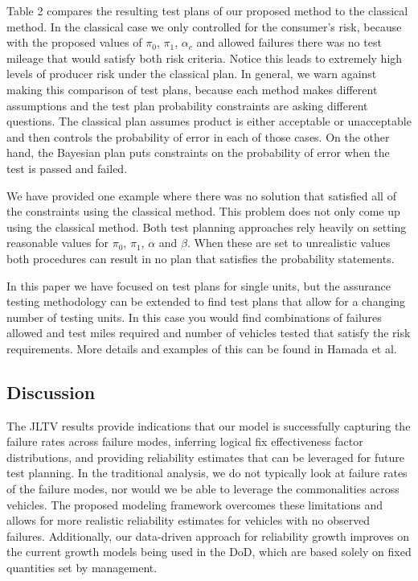 \documentclass[12pt]{article}
\begin{document}
Table 2 compares the resulting test plans of our proposed method to the classical method.  In the classical case we only controlled for the consumer's risk, because with the proposed values of  $\pi_0$, $\pi_1$, $\alpha_c$ and allowed failures there was no test mileage that would satisfy both risk criteria.  Notice this leads to extremely high levels of producer risk under the classical plan.  In general, we warn against making this comparison of test plans, because each method makes different assumptions and the test plan probability constraints are asking different questions.  The classical plan assumes product is either acceptable or unacceptable and then controls the probability of error in each of those cases.  On the other hand, the Bayesian plan puts constraints on the probability of error when the test is passed and failed.

We have provided one example where there was no solution that satisfied all of the constraints using the classical method.
This problem does not only come up using the classical method.  Both test planning approaches rely heavily on setting reasonable values for $\pi_0$, $\pi_1$, $\alpha$ and $\beta$.   When these are set to unrealistic values both procedures can result in no plan that satisfies the probability statements. ~\cite{ref9}

In this paper we have focused on test plans for single units, but the assurance testing methodology can be extended to find test plans that
allow for a changing number of testing units.  In this case you would find
combinations of failures allowed and test miles required and number of vehicles
tested that satisfy the risk requirements. More details and examples of this can
be found in Hamada et al. ~\cite{ref4}

\subsection{Discussion}
The JLTV results provide indications that our model is successfully
capturing the failure rates across failure modes, inferring logical fix
effectiveness factor distributions, and providing reliability estimates that can
be leveraged for future test planning. In the traditional analysis, we do not
typically look at failure rates of the failure modes, nor would we be able to
leverage the commonalities across vehicles. The proposed modeling framework
overcomes these limitations and allows for more realistic reliability estimates
for vehicles with no observed failures. Additionally, our data-driven approach
for reliability growth improves on the current growth models being used in the
DoD, which are based solely on fixed quantities set by management.
\end{document}
